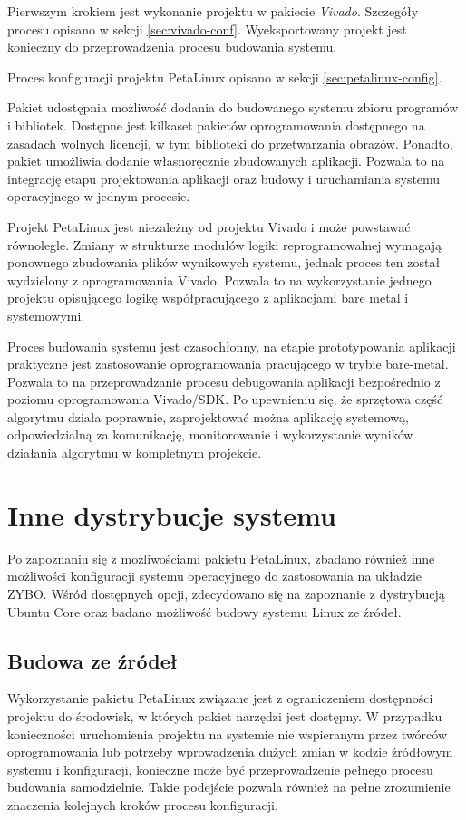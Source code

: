 Pierwszym krokiem jest wykonanie projektu w pakiecie \emph{Vivado}. Szczegóły procesu opisano w sekcji \ref{sec:vivado-conf}. Wyeksportowany projekt jest konieczny do przeprowadzenia procesu budowania systemu.

Proces konfiguracji projektu PetaLinux opisano w sekcji \ref{sec:petalinux-config}.

Pakiet udostępnia możliwość dodania do budowanego systemu zbioru programów i bibliotek. Dostępne jest kilkaset pakietów oprogramowania dostępnego na zasadach wolnych licencji, w tym biblioteki do przetwarzania obrazów. Ponadto, pakiet umożliwia dodanie własnoręcznie zbudowanych aplikacji. Pozwala to na integrację etapu projektowania aplikacji oraz budowy i uruchamiania systemu operacyjnego w jednym procesie.

Projekt PetaLinux jest niezależny od projektu Vivado i może powstawać równolegle. Zmiany w strukturze modułów logiki reprogramowalnej wymagają ponownego zbudowania plików wynikowych systemu, jednak proces ten został wydzielony z oprogramowania Vivado. Pozwala to na wykorzystanie jednego projektu opisującego logikę współpracującego z aplikacjami bare metal i systemowymi. 

Proces budowania systemu jest czasochłonny, na etapie prototypowania aplikacji praktyczne jest zastosowanie oprogramowania pracującego w trybie bare-metal. Pozwala to na przeprowadzanie procesu debugowania aplikacji bezpośrednio z poziomu oprogramowania Vivado/SDK. Po upewnieniu się, że sprzętowa część algorytmu działa poprawnie, zaprojektować można aplikację systemową, odpowiedzialną za komunikację, monitorowanie i wykorzystanie wyników działania algorytmu w kompletnym projekcie.

\section{Inne dystrybucje systemu}
Po zapoznaniu się z możliwościami pakietu PetaLinux, zbadano również inne możliwości konfiguracji systemu operacyjnego do zastosowania na układzie ZYBO. Wśród dostępnych opcji, zdecydowano się na zapoznanie z dystrybucją Ubuntu Core oraz badano możliwość budowy systemu Linux ze źródeł.

\subsection{Budowa ze źródeł}
Wykorzystanie pakietu PetaLinux związane jest z ograniczeniem dostępności projektu do środowisk, w których pakiet narzędzi jest dostępny. W przypadku konieczności uruchomienia projektu na systemie nie wspieranym przez twórców oprogramowania lub potrzeby wprowadzenia dużych zmian w kodzie źródłowym systemu i konfiguracji, konieczne może być przeprowadzenie pełnego procesu budowania samodzielnie. Takie podejście pozwala również na pełne zrozumienie znaczenia kolejnych kroków procesu konfiguracji.

